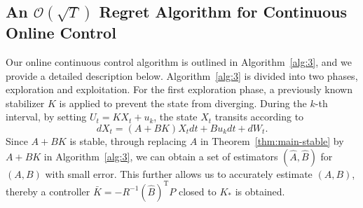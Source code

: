 \documentclass{article}
\theoremstyle{definition}
\begin{document}





\subsection{An $\mathcal{O}(\sqrt{T})$ Regret Algorithm for Continuous Online Control}

Our online continuous control algorithm is outlined in Algorithm~\ref{alg:3}, and we provide a detailed description below. Algorithm~\ref{alg:3} is divided into two phases, exploration and exploitation. For the first exploration phase, a previously known stabilizer $K$ is applied to prevent the state from diverging. During the $k$-th interval, by setting $U_{t}=KX_{t}+u_{k}$, the state $X_{t}$ transits according to 
$$dX_{t}=(A+BK)X_{t}dt+Bu_{k}dt+dW_{t}.$$
Since $A+BK$ is stable, through replacing $A$ in Theorem~\ref{thm:main-stable} by $A+BK$ in Algorithm~\ref{alg:3}, we can obtain a set of estimators $(\hat{A},\hat{B})$ for $(A,B)$ with small error. This further allows us to accurately estimate $(A,B)$, thereby a controller $\bar{K}=-R^{-1}(\hat{B})^{\mathrm{T}}P$ closed to $K_{*}$ is obtained.
\end{document}
